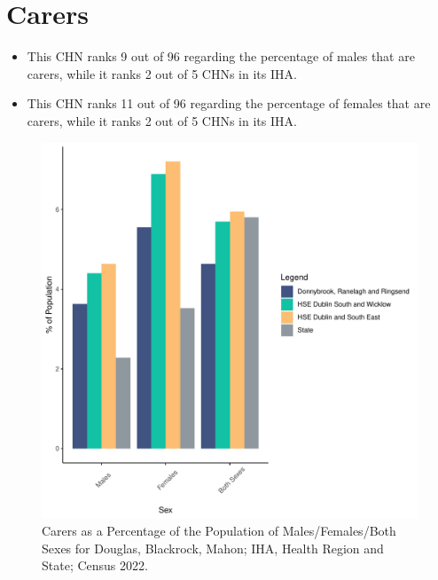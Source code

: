 \documentclass{article}
\begin{document}
\section{Carers}\label{sect:Carers}
\begin{itemize}
\item This CHN ranks  9 out of 96 regarding the percentage of males that are carers, while it ranks   2 out of 5 CHNs in its IHA.
\item This CHN ranks  11 out of 96 regarding the percentage of females that are carers, while it ranks   2 out of 5 CHNs in its IHA.
\end{itemize}
\begin{figure}[H]
	\centering
	\includegraphics[width = 150mm]{../figures/CareED.pdf}
	\caption{Carers as a Percentage of the Population of Males/Females/Both Sexes for Douglas, Blackrock, Mahon; IHA, Health Region and State; Census 2022.}
	\label{fig:2ae19629-1a6a-13a3-e055-000000000001}
	\end{figure}
\end{document}
